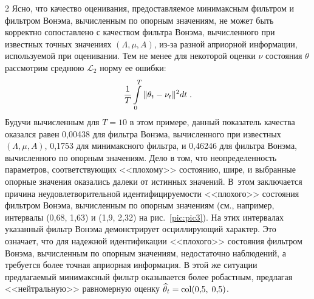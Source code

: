 \begin{multicols}{2}
 Ясно, что качество оценивания, предоставляемое минимаксным фильтром
 и фильтром Вонэма, вычисленным по опорным значениям, не может
 быть корректно сопоставлено с качеством фильтра Вонэма, вычисленного при
 известных точных значениях $(\Lambda,\mu,A)$, из-за разной априорной
 информации, используемой при оценивании. Тем не менее для некоторой
 оценки $\nu$ состояния $\theta$ рассмотрим среднюю $\mathcal{L}_2$
 норму ее ошибки:
$$\displaystyle\frac{\displaystyle 1\mathstrut}{\displaystyle T\mathstrut}\int\limits_0^T\|\theta_t-\nu_t\|^2dt\;.$$
 Будучи вычисленным для $T=10$ в этом примере, данный показатель качества
 оказался равен 0,00438 для фильтра Вонэма, вычисленного при известных
 $(\Lambda,\mu,A)$, 0,1753 для минимаксного фильтра, и 0,46246 для фильтра
 Вонэма, вычисленного по опорным значениям. Дело в том, что неопределенность
 параметров, соответствующих <<плохому>> состоянию, шире, и выбранные опорные
 значения оказались далеки от истинных значений. В~этом заключается причина
 неудовлетворительной идентифицируемости <<плохого>> состояния фильтром
 Во\-нэ\-ма, вычисленным по опорным значениям (см., например, интервалы
 (0,68, 1,63) и (1,9, 2,32) на рис.~\ref{pic:pic3}). На этих интервалах
 указанный фильтр Вонэма демонстрирует осциллирующий характер. Это означает,
 что для надежной идентификации <<плохого>> состояния фильтром Вонэма,
 вычисленным по опорным значениям, недостаточно наблюдений, а требуется более
 точная априорная информация. В этой же ситуации предлагаемый минимаксный
 фильтр оказывается более робастным, предлагая <<нейтральную>> равномерную
 оценку $\widehat{\theta}_t=\mathop{\mathrm{col}}(0{,}5,\; 0{,}5)$.

\end{multicols}

\begin{figure*} %
\vspace*{1pt}
\begin{center}
\mbox{%
\epsfxsize=117.835mm
}
\end{center}
\vspace*{-9pt}
\end{figure*}

\begin{figure*} %
\vspace*{1pt}
\begin{center}
\mbox{%
\epsfxsize=117.835mm
}
\end{center}
\vspace*{-9pt}
 \label{pic:pic3}
\end{figure*}

